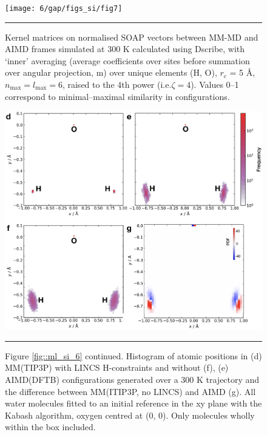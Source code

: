 \documentclass[../../main.tex]{subfiles}
\begin{document}
\begin{figure}[h!]
	\vspace{0.4cm}
	\centering
	\texttt{[image: 6/gap/figs\_si/fig7]}
	\vspace{0.2cm}
	\hrule
	\caption{Kernel matrices on normalised SOAP vectors between MM-MD and AIMD frames simulated at 300 K calculated using Dscribe,\cite{Himanen2020} with ‘inner’ averaging (average coefficients over sites before summation over angular projection, m) over unique elements (H, O), $r_c$ = 5 \AA, $n_\text{max}=l_\text{max}=6$, raised to the 4th power (i.e.$\zeta=4$). Values 0--1 correspond to minimal–maximal similarity in configurations.}
	\label{fig::ml_si_7}
\end{figure}




\begin{figure}[h!]
	\vspace{0.4cm}
	\centering
	\includegraphics[width=\textwidth]{6/gap/figs_si/fig7cont}
	\vspace{0.2cm}
	\hrule
	\caption{Figure \ref{fig::ml_si_6} continued. Histogram of atomic positions in (d) MM(TIP3P) with LINCS H-constraints and without (f), (e) AIMD(DFTB) configurations generated over a 300 K trajectory and the difference between MM(ITIP3P, no LINCS) and AIMD (g). All water molecules fitted to an initial reference in the xy plane with the Kabash algorithm, oxygen centred at (0, 0). Only molecules wholly within the box included.}
	\label{fig::ml_si_7cont}
\end{figure}
\end{document}
